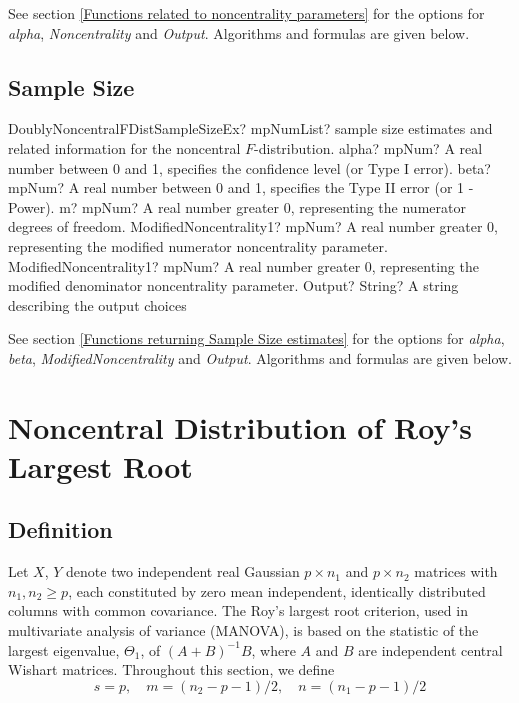 \vspace{0.3cm}
See section \ref{Functions related to noncentrality parameters} for the options for  {\itshape\sffamily alpha}, {\itshape\sffamily Noncentrality} and {\itshape\sffamily Output}. Algorithms and formulas are given below.




\subsection{Sample Size}
\label{DoublyNonCentralFDistributionSampleSize}


\begin{mpFunctionsExtract}
	\mpFunctionSixNotImplemented
	{DoublyNoncentralFDistSampleSizeEx? mpNumList? sample size estimates and related information for the noncentral $F$-distribution.}
	{alpha? mpNum? A real number between 0 and 1, specifies the confidence level (or Type I error).}
	{beta? mpNum?  A real number between 0 and 1, specifies the Type II error (or 1 - Power).}
	{m? mpNum? A real number greater 0, representing the numerator  degrees of freedom.}
	{ModifiedNoncentrality1? mpNum? A real number greater 0, representing the modified numerator noncentrality parameter.}
	{ModifiedNoncentrality1? mpNum? A real number greater 0, representing the modified denominator noncentrality parameter.}
	{Output? String? A string describing the output choices}
\end{mpFunctionsExtract}


\vspace{0.3cm}
See section \ref{Functions returning Sample Size estimates} for the options for  {\itshape\sffamily alpha}, {\itshape\sffamily beta}, {\itshape\sffamily ModifiedNoncentrality} and {\itshape\sffamily Output}. Algorithms and formulas are given below.






\newpage
\section{Noncentral Distribution of Roy's Largest Root}

\subsection{Definition}

Let $X$, $Y$ denote two independent real Gaussian $p \times n_1$ and $p \times n_2$ matrices with $n_1, n_2 \geq p$, each constituted by zero mean independent, identically distributed columns with common covariance. The Roy's largest root criterion, used in multivariate analysis of variance (MANOVA), is based on the statistic of the largest eigenvalue, $\Theta_1$, of $(A+ B)^{-1}B$, where $A$ and $B$ are independent central Wishart matrices. Throughout this section, we define
\begin{equation}
	s=p, \quad  m=(n_2-p-1)/2, \quad  n=(n_1-p-1)/2
\end{equation}



